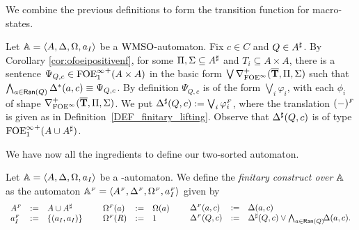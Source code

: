 We combine the previous definitions to form the transition function for macro-states.

\begin{definition}\label{PROP_DeltaPowerset}
Let $\mathbb{A} = \langle{A,\Delta,\Omega,a_I}\rangle$ be a $\mathrm{WMSO}$-automaton. Fix $c \in C$ and $Q \in A^{\sharp}$. By Corollary \ref{cor:ofoeipositivenf}, for some $\Pi,\Sigma \subseteq A^{\sharp}$ and $T_i \subseteq A \times A$, there is a sentence $\Psi_{Q,c} \in {\ensuremath{\mathrm{FOE}^{\infty}_1}}^+(A\times A)$ in the basic form $\bigvee \nabla^+_{\mathrm{FOE}^{\infty}}(\overline{{\mathbf{T}}},\Pi,\Sigma)$ such that $\bigwedge_{a \in \mathsf{Ran}(Q)} \Delta^{*}(a,c) \equiv \Psi_{Q,c}$. By definition $\Psi_{Q,c}$ is of the form $\bigvee_{i}\varphi_i$, with each $\phi_{i}$ of shape $\nabla^+_{\mathrm{FOE}^{\infty}}(\overline{{\mathbf{T}}},\Pi,\Sigma)$. We put $\Delta^{\sharp}(Q,c) := \bigvee_{i}\varphi_i^{{\scriptscriptstyle F}}$, where the translation $(-)^{{\scriptscriptstyle F}}$ is given as in Definition~\ref{DEF_finitary_lifting}. Observe that $\Delta^{\sharp}(Q,c)$ is of type ${\mathrm{FOE}^{\infty}_1}^+(A \cup A^{\sharp})$.
\end{definition}

We have now all the ingredients to define our two-sorted automaton.

\begin{definition}\label{def:finitaryconstruct}
Let $\mathbb{A} = \langle{A,\Delta,\Omega,a_I}\rangle$ be a {\wmso-automaton}.
We define the \emph{finitary construct over $\mathbb{A}$} as the automaton 
$\mathbb{A}^{{\scriptscriptstyle F}} = \langle{A^{{\scriptscriptstyle F}},\Delta^{{\scriptscriptstyle F}},\Omega^{{\scriptscriptstyle F}},a_I^{{\scriptscriptstyle F}}}\rangle$ given by
\[
\begin{array}{lll}
   A^{\fin}   &\df&  A \cup \shA
\\ a_I^{\fin} &\df&  \{(a_I,a_I)\}
\end{array}
%
\hspace*{5mm}
%
\begin{array}{lll}
   \pmap^{\fin}(a) &\df& \pmap(a)
\\ \pmap^{\fin}(R) &\df& 1
\end{array}
%
\hspace*{5mm}
%
\begin{array}{lll}
   \tmap^{\fin}(a,c) &\df& \tmap(a,c) 
\\ \tmap^{\fin}(Q,c) &\df&  
  \shDe(Q,c) \vee \bigwedge_{a \in \Ran(Q)} \! \! \tmap(a,c).
\end{array}
\]
\end{definition}

